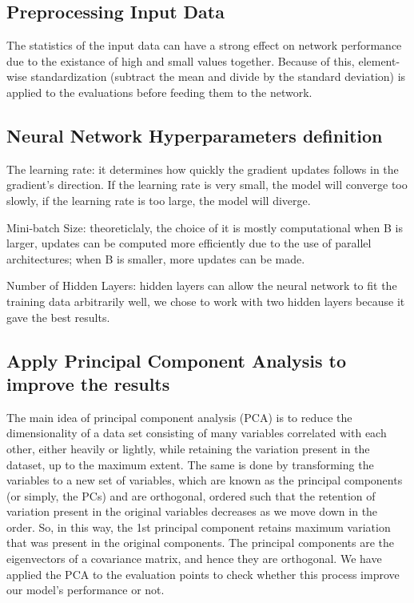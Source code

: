 \documentclass[a4paper,UKenglish]{lipics-v2016}
\begin{document}
 \subsection{Preprocessing Input Data\label{Preprocessing}}
 The statistics of the input data can have a strong effect on network performance due to the existance of high and small values together. Because of this, element-wise standardization (subtract the mean and divide by the standard deviation) is applied to the evaluations before feeding them to the network.

 \subsection{Neural Network Hyperparameters definition} \label{Hyperparameters}

 The learning rate: it determines how quickly the gradient updates follows in the gradient’s direction. If the learning rate is very small, the model will converge too slowly, if the learning rate is too large, the model will diverge.

 Mini-batch Size: theoreticlaly, the choice of it is mostly computational when B is larger, updates can be computed more efficiently due to the use of parallel architectures; when B is smaller, more updates can be made.

 Number of Hidden Layers: hidden layers can allow the neural network to fit the training data arbitrarily well, we chose to work with two hidden layers because it gave the best results.

 \subsection{Apply Principal Component Analysis to improve the results} \label{pca}
 The main idea of principal component analysis (PCA) is to reduce the dimensionality of a data set consisting of many variables correlated with each other, either heavily or lightly, while retaining the variation present in the dataset, up to the maximum extent. The same is done by transforming the variables to a new set of variables, which are known as the principal components (or simply, the PCs) and are orthogonal, ordered such that the retention of variation present in the original variables decreases as we move down in the order. So, in this way, the 1st principal component retains maximum variation that was present in the original components. The principal components are the eigenvectors of a covariance matrix, and hence they are orthogonal. We have applied the PCA to the evaluation points to check whether this process improve our model’s performance or not.
\end{document}
